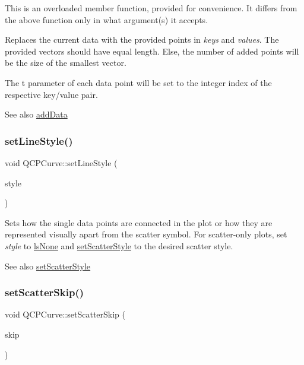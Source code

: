 This is an overloaded member function, provided for convenience. It differs from the above function only in what argument(s) it accepts.

Replaces the current data with the provided points in {\itshape keys} and {\itshape values}. The provided vectors should have equal length. Else, the number of added points will be the size of the smallest vector.

The t parameter of each data point will be set to the integer index of the respective key/value pair.

\begin{DoxySeeAlso}{See also}
\mbox{\hyperlink{class_q_c_p_curve_a73edf394b94f3f24f07518e30565a07f}{add\+Data}} 
\end{DoxySeeAlso}
\mbox{\label{class_q_c_p_curve_a4a377ec863ff81a1875c3094a6177c19}} 
\subsubsection{\texorpdfstring{setLineStyle()}{setLineStyle()}}
{\footnotesize\ttfamily void Q\+C\+P\+Curve\+::set\+Line\+Style (\begin{DoxyParamCaption}\item[{\mbox{\hyperlink{class_q_c_p_curve_a2710e9f79302152cff794c6e16cc01f1}{Q\+C\+P\+Curve\+::\+Line\+Style}}}]{style }\end{DoxyParamCaption})}

Sets how the single data points are connected in the plot or how they are represented visually apart from the scatter symbol. For scatter-\/only plots, set {\itshape style} to \mbox{\hyperlink{class_q_c_p_curve_a2710e9f79302152cff794c6e16cc01f1aec1601a191cdf0b4e761c4c66092cc48}{ls\+None}} and \mbox{\hyperlink{class_q_c_p_curve_a55e43b44709bf50a35500644988aa706}{set\+Scatter\+Style}} to the desired scatter style.

\begin{DoxySeeAlso}{See also}
\mbox{\hyperlink{class_q_c_p_curve_a55e43b44709bf50a35500644988aa706}{set\+Scatter\+Style}} 
\end{DoxySeeAlso}
\mbox{\label{class_q_c_p_curve_a97dbfecd497e972d5f2162615e6da5be}} 
\subsubsection{\texorpdfstring{setScatterSkip()}{setScatterSkip()}}
{\footnotesize\ttfamily void Q\+C\+P\+Curve\+::set\+Scatter\+Skip (\begin{DoxyParamCaption}\item[{int}]{skip }\end{DoxyParamCaption})}


